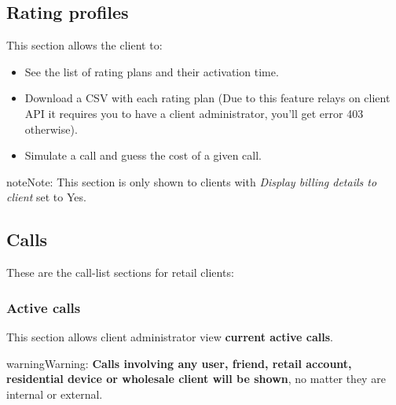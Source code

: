\documentclass[letterpaper,10pt,english]{sphinxmanual}
\begin{document}
\subsection{Rating profiles}
\label{administration_portal/client/retail/rating_profiles:rating-profiles}\label{administration_portal/client/retail/rating_profiles::doc}
This section allows the client to:
\begin{itemize}
\item {} 
See the list of rating plans and their activation time.

\item {} 
Download a CSV with each rating plan (Due to this feature relays on client API it requires you to have a client administrator, you'll get error 403 otherwise).

\item {} 
Simulate a call and guess the cost of a given call.

\end{itemize}

\begin{notice}{note}{Note:}
This section is only shown to clients with \emph{Display billing details to client} set to Yes.
\end{notice}


\subsection{Calls}
\label{administration_portal/client/retail/calls/index::doc}\label{administration_portal/client/retail/calls/index:calls}
These are the call-list sections for retail clients:


\subsubsection{Active calls}
\label{administration_portal/client/retail/calls/active_calls::doc}\label{administration_portal/client/retail/calls/active_calls:active-calls}
This section allows client administrator view \textbf{current active calls}.

\begin{notice}{warning}{Warning:}
\textbf{Calls involving any user, friend, retail account, residential device or wholesale client will be shown},
no matter they are internal or external.
\end{notice}
\end{document}
